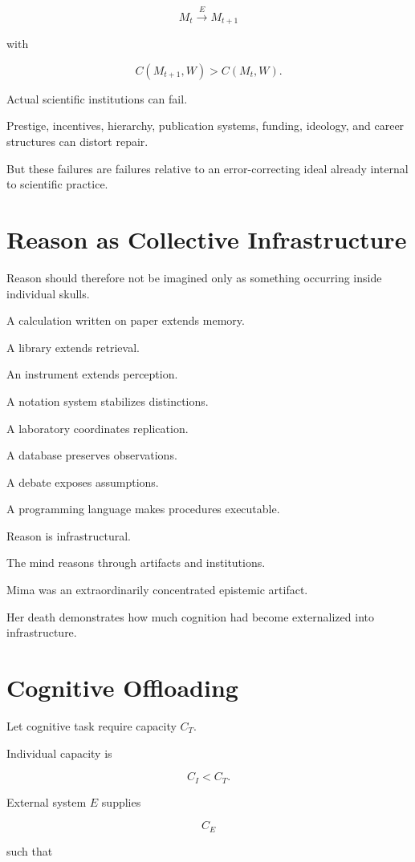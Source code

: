 \documentclass[11pt,oneside]{book}
\theoremstyle{definition}
\theoremstyle{remark}
\begin{document}
\[
M_t
\xrightarrow{E}
M_{t+1}
\]

with

\[
C(M_{t+1},W)
>
C(M_t,W).
\]

Actual scientific institutions can fail.

Prestige, incentives, hierarchy, publication systems, funding, ideology, and career structures can distort repair.

But these failures are failures relative to an error-correcting ideal already internal to scientific practice.

\section{Reason as Collective Infrastructure}

Reason should therefore not be imagined only as something occurring inside individual skulls.

A calculation written on paper extends memory.

A library extends retrieval.

An instrument extends perception.

A notation system stabilizes distinctions.

A laboratory coordinates replication.

A database preserves observations.

A debate exposes assumptions.

A programming language makes procedures executable.

Reason is infrastructural.

The mind reasons through artifacts and institutions.

Mima was an extraordinarily concentrated epistemic artifact.

Her death demonstrates how much cognition had become externalized into infrastructure.

\section{Cognitive Offloading}

Let cognitive task require capacity \(C_T\).

Individual capacity is

\[
C_I<C_T.
\]

External system \(E\) supplies

\[
C_E
\]

such that
\end{document}
